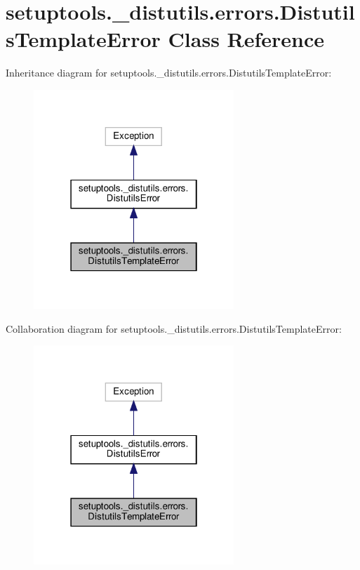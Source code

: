 \hypertarget{classsetuptools_1_1__distutils_1_1errors_1_1DistutilsTemplateError}{}\section{setuptools.\+\_\+distutils.\+errors.\+Distutils\+Template\+Error Class Reference}
\label{classsetuptools_1_1__distutils_1_1errors_1_1DistutilsTemplateError}


Inheritance diagram for setuptools.\+\_\+distutils.\+errors.\+Distutils\+Template\+Error\+:
\nopagebreak
\begin{figure}[H]
\begin{center}
\leavevmode
\includegraphics[width=214pt]{classsetuptools_1_1__distutils_1_1errors_1_1DistutilsTemplateError__inherit__graph}
\end{center}
\end{figure}


Collaboration diagram for setuptools.\+\_\+distutils.\+errors.\+Distutils\+Template\+Error\+:
\nopagebreak
\begin{figure}[H]
\begin{center}
\leavevmode
\includegraphics[width=214pt]{classsetuptools_1_1__distutils_1_1errors_1_1DistutilsTemplateError__coll__graph}
\end{center}
\end{figure}


